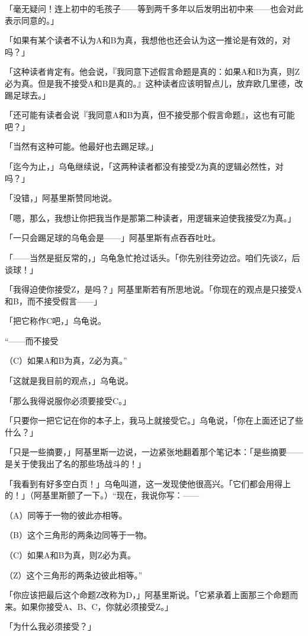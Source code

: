 \documentclass[
  12pt,
  twoside,
  openright,
  oldfontcommands,
]{memoir}
\newcommand{\kaitismall}[1]{{\kaitifamily\small #1}}
\begin{document}
「毫无疑问！连上初中的毛孩子------等到两千多年以后发明出初中来------也会对此表示同意的。」

「如果有某个读者不认为A和B为真，我想他也还会认为这一推论是有效的，对吗？」

「这种读者肯定有。他会说，『我同意下述假言命题是真的：如果A和B为真，则Z必为真。但是我不接受A和B是真的。』这种读者应该明智点儿，放弃欧几里德，改踢足球去。」

「还可能有读者会说『我同意A和B为真，但不接受那个假言命题』，这也有可能吧？」

「当然有这种可能。他最好也去踢足球。」

「迄今为止，」乌龟继续说，「这两种读者都没有接受Z为真的逻辑必然性，对吗？」

「没错，」阿基里斯赞同地说。

「嗯，那么，我想让你把我当作是那第二种读者，用逻辑来迫使我接受Z为真。」

「一只会踢足球的乌龟会是------」阿基里斯有点吞吞吐吐。

「------当然是挺反常的，」乌龟急忙抢过话头。「你先别往旁边岔。咱们先谈Z，后谈球！」

「我得迫使你接受Z，是吗？」阿基里斯若有所思地说。「你现在的观点是只接受A和B，而不接受假言------」

「把它称作C吧，」乌龟说。

``------而不接受

（C）如果A和B为真，Z必为真。''

「这就是我目前的观点，」乌龟说。

「那么我得说服你必须要接受C。」

「只要你一把它记在你的本子上，我马上就接受它。」乌龟说，「你在上面还记了些什么？」

「只是一些摘要，」阿基里斯一边说，一边紧张地翻着那个笔记本：「是些摘要------是关于使我出了名的那些场战斗的！」

「我看到有好多空白页！」乌龟叫道，这一发现使他很高兴。「它们都会用得上的！」\kaitismall{（阿基里斯颤了一下。）}``现在，我说你写：------

（A）同等于一物的彼此亦相等。

（B）这个三角形的两条边同等于一物。

（C）如果A和B为真，则Z必为真。

（Z）这个三角形的两条边彼此相等。''

「你应该把最后这个命题Z改称为D，」阿基里斯说。「它紧承着上面那三个命题而来。如果你接受A、B、C，你就必须接受Z。」

「为什么我必须接受？」
\end{document}
